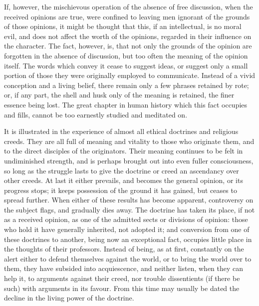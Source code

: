 \documentclass[11pt,openany]{book}
\begin{document}
If, however, the mischievous operation of the absence of free discussion, when the received opinions are true, were confined to leaving men ignorant of the grounds of those opinions, it might be thought that this, if an intellectual, is no moral evil, and does not affect the worth of the opinions, regarded in their influence on the character. The fact, however, is, that not only the grounds of the opinion are forgotten in the absence of discussion, but too often the meaning of the opinion itself. The words which convey it cease to suggest ideas, or suggest only a small portion of those they were originally employed to communicate. Instead of a vivid conception and a living belief, there remain only a few phrases retained by rote; or, if any part, the shell and husk only of the meaning is retained, the finer essence being lost. The great chapter in human history which this fact occupies and fills, cannot be too earnestly studied and meditated on.

It is illustrated in the experience of almost all ethical doctrines and religious creeds. They are all full of meaning and vitality to those who originate them, and to the direct disciples of the originators. Their meaning continues to be felt in undiminished strength, and is perhaps brought out into even fuller consciousness, so long as the struggle lasts to give the doctrine or creed an ascendancy over other creeds. At last it either prevails, and becomes the general opinion, or its progress stops; it keeps possession of the ground it has gained, but ceases to spread further. When either of these results has become apparent, controversy on the subject flags, and gradually dies away. The doctrine has taken its place, if not as a received opinion, as one of the admitted sects or divisions of opinion: those who hold it have generally inherited, not adopted it; and conversion from one of these doctrines to another, being now an exceptional fact, occupies little place in the thoughts of their professors. Instead of being, as at first, constantly on the alert either to defend themselves against the world, or to bring the world over to them, they have subsided into acquiescence, and neither listen, when they can help it, to arguments against their creed, nor trouble dissentients (if there be such) with arguments in its favour. From this time may usually be dated the decline in the living power of the doctrine.
\end{document}
